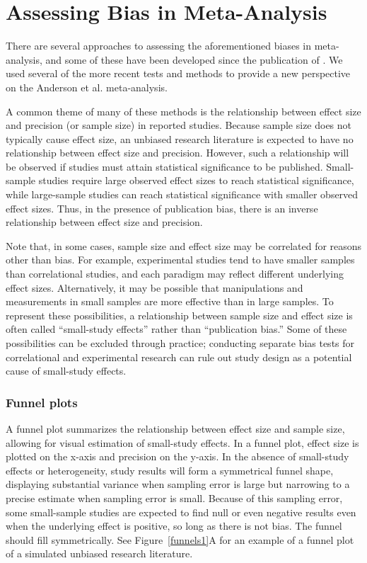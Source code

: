\documentclass[man]{apa6}
\begin{document}
\section{Assessing Bias in Meta-Analysis}
There are several approaches to assessing the aforementioned biases in meta-analysis, and some of these have been developed since the publication of \citet{Anderson:etal:2010}. We used several of the more recent tests and methods to provide a new perspective on the Anderson et al. meta-analysis.

A common theme of many of these methods is the relationship between effect size and precision (or sample size) in reported studies. Because sample size does not typically cause effect size, an unbiased research literature is expected to have no relationship between effect size and precision. However, such a relationship will be observed if studies must attain statistical significance to be published. Small-sample studies require large observed effect sizes to reach statistical significance, while large-sample studies can reach statistical significance with smaller observed effect sizes. Thus, in the presence of publication bias, there is an inverse relationship between effect size and precision. 

Note that, in some cases, sample size and effect size may be correlated for reasons other than bias. For example, experimental studies tend to have smaller samples than correlational studies, and each paradigm may reflect different underlying effect sizes. Alternatively, it may be possible that manipulations and measurements in small samples are more effective than in large samples. To represent these possibilities, a relationship between sample size and effect size is often called ``small-study effects'' rather than ``publication bias.'' Some of these possibilities can be excluded through practice; conducting separate bias tests for correlational and experimental research can rule out study design as a potential cause of small-study effects.

\subsubsection{Funnel plots}
A funnel plot summarizes the relationship between effect size and sample size, allowing for visual estimation of small-study effects. In a funnel plot, effect size is plotted on the x-axis and precision on the y-axis. In the absence of small-study effects or heterogeneity, study results will form a symmetrical funnel shape, displaying substantial variance when sampling error is large but narrowing to a precise estimate when sampling error is small. Because of this sampling error, some small-sample studies are expected to find null or even negative results even when the underlying effect is positive, so long as there is not bias. The funnel should fill symmetrically. See Figure~\ref{funnels1}A for an example of a funnel plot of a simulated unbiased research literature.
\end{document}
